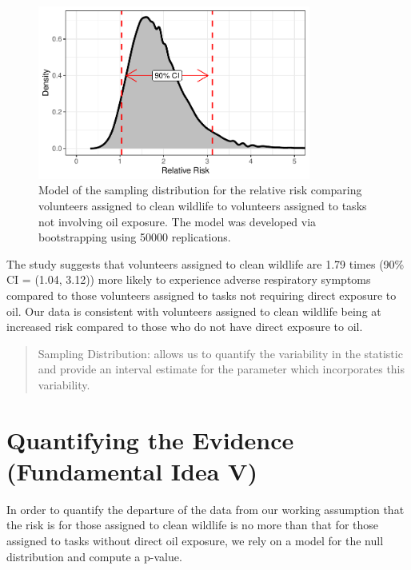 \documentclass[
  letterpaper,
  DIV=11,
  numbers=noendperiod]{scrreprt}
\theoremstyle{plain}
\theoremstyle{definition}
\theoremstyle{definition}
\theoremstyle{remark}
\begin{document}
\begin{figure}

{\centering \includegraphics[width=0.8\textwidth,height=\textheight]{./images/fig-recaplanguage-sampling-distribution-1.pdf}

}

\caption{\label{fig-recaplanguage-sampling-distribution}Model of the
sampling distribution for the relative risk comparing volunteers
assigned to clean wildlife to volunteers assigned to tasks not involving
oil exposure. The model was developed via bootstrapping using 50000
replications.}

\end{figure}

The study suggests that volunteers assigned to clean wildlife are 1.79
times (90\% CI = (1.04, 3.12)) more likely to experience adverse
respiratory symptoms compared to those volunteers assigned to tasks not
requiring direct exposure to oil. Our data is consistent with volunteers
assigned to clean wildlife being at increased risk compared to those who
do not have direct exposure to oil.

\begin{quote}
Sampling Distribution: allows us to quantify the variability in the
statistic and provide an interval estimate for the parameter which
incorporates this variability.
\end{quote}

\hypertarget{quantifying-the-evidence-fundamental-idea-v}{%
\section{Quantifying the Evidence (Fundamental Idea
V)}\label{quantifying-the-evidence-fundamental-idea-v}}

In order to quantify the departure of the data from our working
assumption that the risk is for those assigned to clean wildlife is no
more than that for those assigned to tasks without direct oil exposure,
we rely on a model for the null distribution and compute a p-value.
\end{document}
